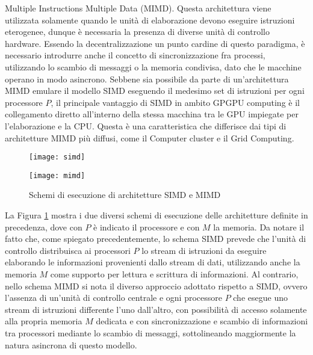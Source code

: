 Multiple Instructions Multiple Data (MIMD)\cite{duncan1990survey}.
Questa architettura viene utilizzata solamente quando le unità di elaborazione
devono eseguire istruzioni eterogenee, dunque è necessaria la presenza
di diverse unità di controllo hardware.
Essendo la decentralizzazione un punto cardine
di questo paradigma, è necessario introdurre anche il concetto di
sincronizzazione fra processi, utilizzando lo scambio di messaggi o
la memoria condivisa, dato che le macchine operano in modo asincrono.
Sebbene sia possibile da parte di un'architettura MIMD emulare il modello
SIMD eseguendo il medesimo set di istruzioni per ogni processore $P$, il
principale vantaggio di SIMD in ambito GPGPU computing è il collegamento diretto
all'interno della stessa macchina tra le GPU impiegate per l'elaborazione e la 
CPU. Questa è una caratteristica che differisce dai tipi di
architetture MIMD più diffusi, come il Computer cluster e il Grid Computing.
\begin{figure}[t]
    \begin{minipage}[b]{.5\linewidth}
        \centering
        \texttt{[image: simd]}
    \end{minipage}
    \begin{minipage}[b]{.5\linewidth}
        \centering
        \texttt{[image: mimd]}
    \end{minipage}
    \caption{Schemi di esecuzione di architetture SIMD e MIMD}
    \label{fig:simd-mimd}
\end{figure}
La Figura \ref{fig:simd-mimd} mostra i due diversi schemi di esecuzione
delle architetture definite in precedenza, dove con $P$ è indicato il processore
e con $M$ la memoria. Da notare il fatto che, come spiegato precedentemente,
lo schema SIMD prevede che l'unità di controllo distribuisca ai processori $P$
lo stream di istruzioni da eseguire elaborando le informazioni
provenienti dallo stream di dati, utilizzando anche la memoria $M$ come supporto
per lettura e scrittura di informazioni. Al contrario, nello schema MIMD si nota
il diverso approccio adottato rispetto a SIMD, ovvero l'assenza di un'unità
di controllo centrale e ogni processore $P$ che esegue
uno stream di istruzioni differente l'uno dall'altro,
con possibilità di accesso solamente alla
propria memoria $M$ dedicata e con sincronizzazione e scambio di informazioni
tra processori mediante lo scambio di messaggi, sottolineando maggiormente
la natura asincrona di questo modello.
\\

